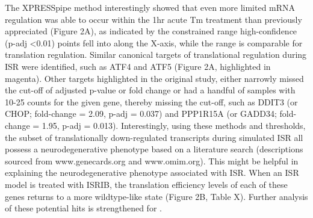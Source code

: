 \documentclass[11pt, a4paper, oneside]{article}
\begin{document}
The XPRESSpipe method interestingly showed that even more limited mRNA regulation was able to occur within the 1hr acute Tm treatment than previously appreciated (Figure 2A), as indicated by the constrained range high-confidence (p-adj \textless 0.01) points fell into along the X-axis, while the range is comparable for translation regulation. Similar canonical targets of translational regulation during ISR were identified, such as ATF4 and ATF5 (Figure 2A, highlighted in magenta). Other targets highlighted in the original study, either narrowly missed the cut-off of adjusted p-value or fold change or had a handful of samples with 10-25 counts for the given gene, thereby missing the cut-off, such as DDIT3 (or CHOP; fold-change = 2.09, p-adj = 0.037) and PPP1R15A (or GADD34; fold-change = 1.95, p-adj = 0.013). Interestingly, using these methods and thresholds, the subset of translationally down-regulated transcripts during simulated ISR all possess a neurodegenerative phenotype based on a literature search (descriptions sourced from www.genecards.org and www.omim.org). This might be helpful in explaining the neurodegenerative phenotype associated with ISR. When an ISR model is treated with ISRIB, the translation efficiency levels of each of these genes returns to a more wildtype-like state (Figure 2B, Table X). Further analysis of these potential hits is strengthened for .
\end{document}
